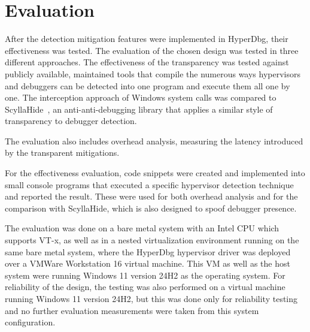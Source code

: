\section{Evaluation}\label{s:evaluation}

After the detection mitigation features were implemented in HyperDbg, their effectiveness was tested. The evaluation of the chosen design was tested in three 
different approaches. The effectiveness of the transparency was tested against publicly available, maintained tools that compile the numerous ways hypervisors 
and debuggers can be detected into one program and execute them all one by one. The interception approach of Windows system calls was compared to 
ScyllaHide~\cite{scyllahide}, an anti-anti-debugging library that applies 
a similar style of transparency to debugger detection.

The evaluation also includes overhead analysis, measuring the latency introduced by the transparent mitigations.

For the effectiveness evaluation, code snippets were created and implemented into small console programs that executed a specific hypervisor detection technique 
and reported the result. These were used for both overhead analysis and for the comparison with ScyllaHide, which is also designed to spoof debugger presence.

The evaluation was done on a bare metal system with an Intel CPU which supports VT-x, as well as in a nested virtualization environment running on the same bare metal system, 
where the HyperDbg hypervisor driver was deployed over a VMWare Workstation 16 virtual machine. This VM as well as the host system were running Windows 11 version 24H2 as the operating system. 
For reliability of the design, the testing was also performed on a virtual machine running Windows 11 version 24H2, 
but this was done only for reliability testing and no further evaluation measurements were taken from this system configuration. 

